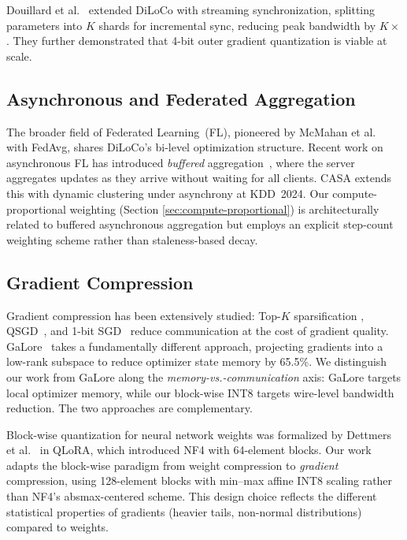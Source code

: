 \documentclass[10pt,conference]{IEEEtran}
\begin{document}
Douillard et al.~\cite{douillard2025streaming} extended DiLoCo with streaming
synchronization, splitting parameters into $K$ shards for incremental sync,
reducing peak bandwidth by $K\!\times$. They further demonstrated that 4-bit
outer gradient quantization is viable at scale.

\subsection{Asynchronous and Federated Aggregation}

The broader field of Federated Learning~(FL), pioneered by McMahan et
al.~\cite{mcmahan2017fedavg} with FedAvg, shares DiLoCo's bi-level
optimization structure. Recent work on asynchronous FL has introduced
\emph{buffered} aggregation~\cite{nguyen2022fedbuff}, where the server
aggregates updates as they arrive without waiting for all clients. CASA
\cite{casa2024kdd} extends this with dynamic clustering under asynchrony at
KDD~2024. Our compute-proportional weighting (Section
\ref{sec:compute-proportional}) is architecturally related to buffered
asynchronous aggregation but employs an explicit step-count weighting scheme
rather than staleness-based decay.

\subsection{Gradient Compression}

Gradient compression has been extensively studied: Top-$K$ sparsification
\cite{aji2017sparse}, QSGD~\cite{alistarh2017qsgd}, and 1-bit
SGD~\cite{seide2014onebit} reduce communication at the cost of gradient
quality. GaLore~\cite{zhao2024galore} takes a fundamentally different
approach, projecting gradients into a low-rank subspace to reduce optimizer
state memory by 65.5\%. We distinguish our work from GaLore along the
\emph{memory-vs.-communication} axis: GaLore targets local optimizer memory,
while our block-wise INT8 targets wire-level bandwidth reduction. The two
approaches are complementary.

Block-wise quantization for neural network weights was formalized by Dettmers
et al.~\cite{dettmers2023qlora} in QLoRA, which introduced NF4 with
64-element blocks. Our work adapts the block-wise paradigm from weight
compression to \emph{gradient} compression, using 128-element blocks with
min--max affine INT8 scaling rather than NF4's absmax-centered scheme. This
design choice reflects the different statistical properties of gradients
(heavier tails, non-normal distributions) compared to weights.
\end{document}
